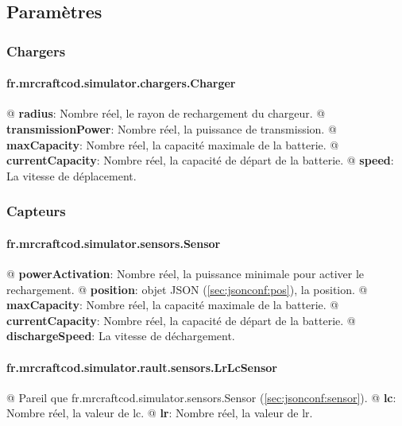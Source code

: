 \documentclass[noposter,final]{polytech/polytech}
\begin{document}
		\subsection{Paramètres\label{sec:jsonconf:params}}
			\subsubsection{Chargers}
				\paragraph{fr.mrcraftcod.simulator.chargers.Charger}
					\begin{easylist}[itemize]
						@ \textbf{radius}: Nombre réel, le rayon de rechargement du chargeur.
						@ \textbf{transmissionPower}: Nombre réel, la puissance de transmission.
						@ \textbf{maxCapacity}: Nombre réel, la capacité maximale de la batterie.
						@ \textbf{currentCapacity}: Nombre réel, la capacité de départ de la batterie.
						@ \textbf{speed}: La vitesse de déplacement.
					\end{easylist}
			
			\subsubsection{Capteurs}
				\paragraph{fr.mrcraftcod.simulator.sensors.Sensor\label{sec:jsonconf:sensor}}
					\begin{easylist}[itemize]
						@ \textbf{powerActivation}: Nombre réel, la puissance minimale pour activer le rechargement.
						@ \textbf{position}: objet JSON (\autoref{sec:jsonconf:pos}), la position.
						@ \textbf{maxCapacity}: Nombre réel, la capacité maximale de la batterie.
						@ \textbf{currentCapacity}: Nombre réel, la capacité de départ de la batterie.
						@ \textbf{dischargeSpeed}: La vitesse de déchargement.
					\end{easylist}
					
				\paragraph{fr.mrcraftcod.simulator.rault.sensors.LrLcSensor}
					\begin{easylist}[itemize]
						@ Pareil que fr.mrcraftcod.simulator.sensors.Sensor (\autoref{sec:jsonconf:sensor}).
						@ \textbf{lc}: Nombre réel, la valeur de lc.
						@ \textbf{lr}: Nombre réel, la valeur de lr.
					\end{easylist}
					
\end{document}
